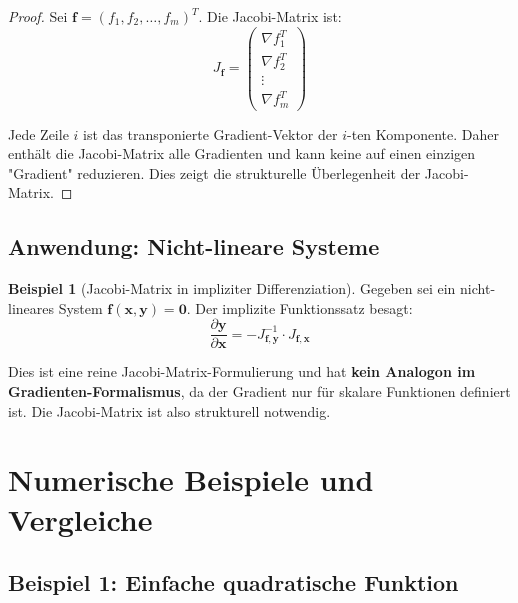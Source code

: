﻿\documentclass[a4paper,12pt]{article}
\theoremstyle{definition}
\newtheorem{beispiel}{Beispiel}
\begin{document}
\begin{proof}
	Sei $\boldsymbol{f} = (f_1, f_2, \ldots, f_m)^T$. Die Jacobi-Matrix ist:
	\[
	J_{\boldsymbol{f}} = \begin{pmatrix}
		\nabla f_1^T \\
		\nabla f_2^T \\
		\vdots \\
		\nabla f_m^T
	\end{pmatrix}
	\]
	
	Jede Zeile $i$ ist das transponierte Gradient-Vektor der $i$-ten Komponente. Daher enthält die Jacobi-Matrix alle Gradienten und kann keine auf einen einzigen "Gradient" reduzieren. Dies zeigt die strukturelle Überlegenheit der Jacobi-Matrix.
\end{proof}

\subsection{Anwendung: Nicht-lineare Systeme}

\begin{beispiel}[Jacobi-Matrix in impliziter Differenziation]
	Gegeben sei ein nicht-lineares System $\boldsymbol{f}(\boldsymbol{x}, \boldsymbol{y}) = \boldsymbol{0}$. Der implizite Funktionssatz besagt:
	\[
	\frac{\partial \boldsymbol{y}}{\partial \boldsymbol{x}} = -J_{\boldsymbol{f},\boldsymbol{y}}^{-1} \cdot J_{\boldsymbol{f},\boldsymbol{x}}
	\]
	
	Dies ist eine reine Jacobi-Matrix-Formulierung und hat \textbf{kein Analogon im Gradienten-Formalismus}, da der Gradient nur für skalare Funktionen definiert ist. Die Jacobi-Matrix ist also strukturell notwendig.
\end{beispiel}

\section{Numerische Beispiele und Vergleiche}

\subsection{Beispiel 1: Einfache quadratische Funktion}
\end{document}
